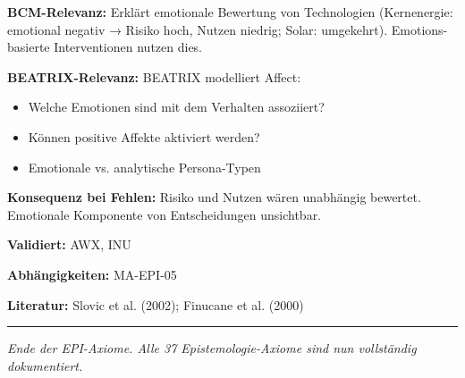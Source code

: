 \textbf{BCM-Relevanz:}
Erklärt emotionale Bewertung von Technologien (Kernenergie: emotional negativ → Risiko hoch, Nutzen niedrig; Solar: umgekehrt). Emotions-basierte Interventionen nutzen dies.

\textbf{BEATRIX-Relevanz:}
BEATRIX modelliert Affect:
\begin{itemize}
    \item Welche Emotionen sind mit dem Verhalten assoziiert?
    \item Können positive Affekte aktiviert werden?
    \item Emotionale vs. analytische Persona-Typen
\end{itemize}

\textbf{Konsequenz bei Fehlen:}
Risiko und Nutzen wären unabhängig bewertet. Emotionale Komponente von Entscheidungen unsichtbar.

\textbf{Validiert:} AWX, INU

\textbf{Abhängigkeiten:} MA-EPI-05

\textbf{Literatur:} Slovic et al. (2002); Finucane et al. (2000)

\bigskip
\noindent\rule{\textwidth}{0.4pt}
\textit{Ende der EPI-Axiome. Alle 37 Epistemologie-Axiome sind nun vollständig dokumentiert.}

